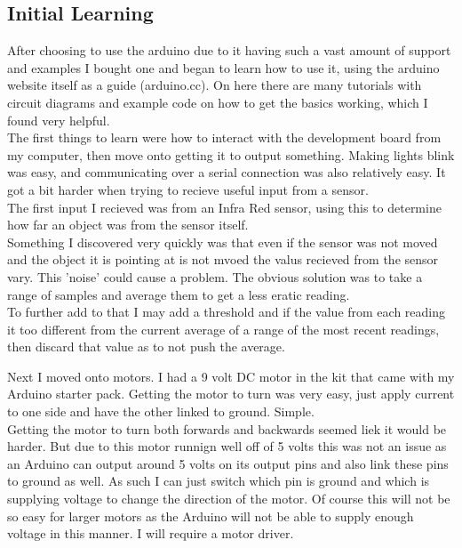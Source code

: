 \documentclass[11pt,fleqn,twoside]{article}
\begin{document}
\subsection{Initial Learning}
After choosing to use the arduino due to it having such a vast amount of support and examples I bought one and began to learn how to use it, using the arduino website itself as a guide (arduino.cc).  On here there are many tutorials with circuit diagrams and example code on how to get the basics working, which I found very helpful.
\\The first things to learn were how to interact with the development board from my computer, then move onto getting it to output something.  Making lights blink was easy, and communicating over a serial connection was also relatively easy.  It got a bit harder when trying to recieve useful input from a sensor.
\\The first input I recieved was from an Infra Red sensor, using this to determine how far an object was from the sensor itself.
\\Something I discovered very quickly was that even if the sensor was not moved and the object it is pointing at is not mvoed the valus recieved from the sensor vary.  This 'noise' could cause a problem.  The obvious solution was to take a range of samples and average them to get a less eratic reading.
\\To further add to that I may add a threshold and if the value from each reading it too different from the current average of a range of the most recent readings, then discard that value as to not push the average.

Next I moved onto motors.  I had a 9 volt DC motor in the kit that came with my Arduino starter pack.  Getting the motor to turn was very easy, just apply current to one side and have the other linked to ground.  Simple.
\\Getting the motor to turn both forwards and backwards seemed liek it would be harder.  But due to this motor runnign well off of 5 volts this was not an issue as an Arduino can output around 5 volts on its output pins and also link these pins to ground as well.  As such I can just switch which pin is ground and which is supplying voltage to change the direction of the motor.  Of course this will not be so easy for larger motors as the Arduino will not be able to supply enough voltage in this manner.  I will require a motor driver.
\end{document}
